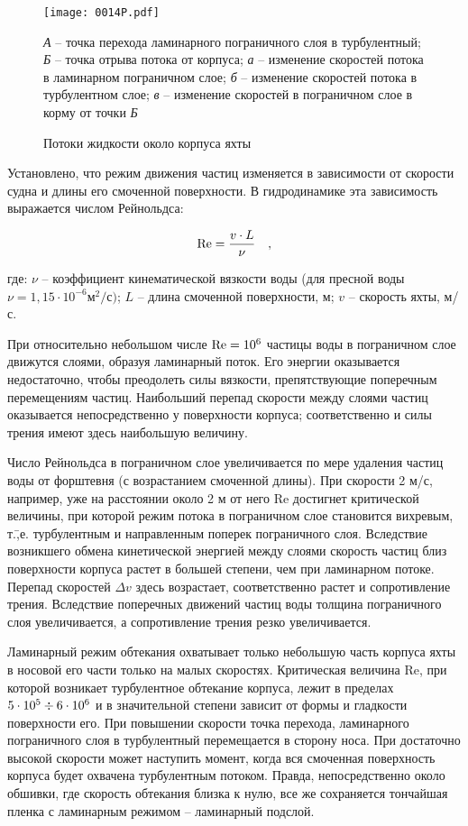 \begin{figure*}[htb]
  \centering
  \texttt{[image: 0014P.pdf]}
  \caption{Потоки жидкости около корпуса яхты}
  \label{fig:14}
  \small
  \centering{}
  \textit{А} \--- точка перехода ламинарного пограничного слоя в турбулентный; \textit{Б} \--- точка отрыва потока от корпуса; \textit{а} \--- изменение скоростей потока в ламинарном пограничном слое; \textit{б} \--- изменение скоростей потока в турбулентном слое; \textit{в} \--- изменение скоростей в пограничном слое в корму от точки \textit{Б}
\end{figure*}

Установлено, что режим движения частиц изменяется в зависимости от скорости судна и длины его смоченной поверхности. В гидродинамике эта зависимость выражается числом Рейнольдса:

\begin{equation}
  \mathrm {Re} = \frac{v \cdot L}{\nu} \quad , 
\end{equation}

где: $\nu$ \--- коэффициент кинематической вязкости воды (для пресной воды $\nu = 1,15 \cdot 10^{-6} \text{м}^2/\text{с})$; $L$ \--- длина смоченной поверхности, м; $v$ \--- скорость яхты, м/с. 

При относительно небольшом числе $\mathrm {Re} = 10^6$ частицы воды в пограничном слое движутся слоями, образуя ламинарный поток. Его энергии оказывается недостаточно, чтобы преодолеть силы вязкости, препятствующие поперечным перемещениям частиц. Наибольший перепад скорости между слоями частиц оказывается непосредственно у поверхности корпуса; соответственно и силы трения имеют здесь наибольшую величину. 

Число Рейнольдса в пограничном слое увеличивается по мере удаления частиц воды от форштевня (с возрастанием смоченной длины). При скорости 2 м/с, например, уже на расстоянии около 2 м от него Re достигнет критической величины, при которой режим потока в пограничном слое становится вихревым, т.\=,е. турбулентным и направленным поперек пограничного слоя. Вследствие возникшего обмена кинетической энергией между слоями скорость частиц близ поверхности корпуса растет в большей степени, чем при ламинарном потоке. Перепад скоростей $\Delta v$ здесь возрастает, соответственно растет и сопротивление трения. Вследствие поперечных движений частиц воды толщина пограничного слоя увеличивается, а сопротивление трения резко увеличивается. 

Ламинарный режим обтекания охватывает только небольшую часть корпуса яхты в носовой его части только на малых скоростях. Критическая величина Re, при которой возникает турбулентное обтекание корпуса, лежит в пределах $5 \cdot 10^5\div 6 \cdot 10^6$ и в значительной степени зависит от формы и гладкости поверхности его. При повышении скорости точка перехода, ламинарного пограничного слоя в турбулентный перемещается в сторону носа. При достаточно высокой скорости может наступить момент, когда вся смоченная поверхность корпуса будет охвачена турбулентным потоком. Правда, непосредственно около обшивки, где скорость обтекания близка к нулю, все же сохраняется тончайшая пленка с ламинарным режимом \--- ламинарный подслой. 

